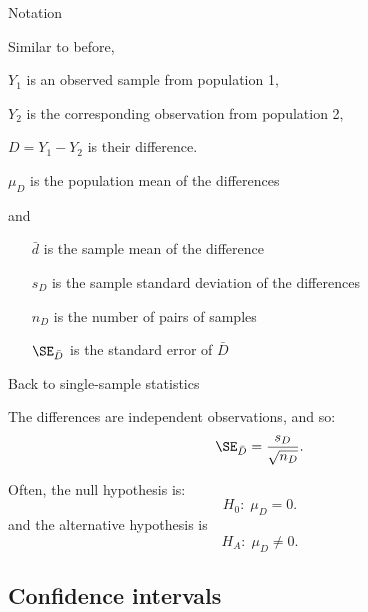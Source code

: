 \begin{frame}{Notation}

  Similar to before,
  \begin{itemizew}{2.5em}
    \item[$Y_1$] is an observed sample from population 1,
    \item[$Y_2$] is the \alert{corresponding} observation from population 2,
    \item[$D=Y_1-Y_2$] is their difference.
    \item[$\mu_D$] is the population mean of the differences
  \end{itemizew}
  and
  \begin{itemize}
    \item[$\bar d$] is the sample mean of the difference 
    \item[$s_D$] is the sample standard deviation of the differences
    \item[$n_D$] is the number of pairs of samples
    \item[$\SE_{\bar D}$] is the standard error of $\bar D$
  \end{itemize}

    \vspace{2em}

\end{frame}

\begin{frame}{Back to single-sample statistics}

    The differences are independent observations, and so:
    \begin{align*}
      \SE_{\bar D} = \frac{s_D}{\sqrt{n_D}} .
    \end{align*}

    \vspace{2em}

    Often, the null hypothesis is:
    \[ H_0: \; \mu_D = 0 .\]
    and the alternative hypothesis is
    \[ H_A: \; \mu_D \neq 0 .\]

\end{frame}

\subsection{Confidence intervals}

